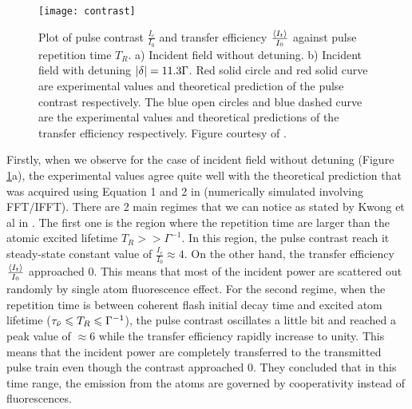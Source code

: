 \begin{figure}[h!]
    \centering
    \texttt{[image: contrast]}
    \caption{Plot of pulse contrast $\frac{I_{c}}{I_{0}}$ and transfer efficiency $\frac{\expval{I_{t}}}{I_{0}}$ against pulse repetition time $T_{R}$. a) Incident field without detuning. b) Incident field with detuning $\abs{\delta} = 11.3 \Gamma$. Red solid circle and red solid curve are experimental values and theoretical prediction of the pulse contrast respectively. The blue open circles and blue dashed curve are the experimental values and theoretical predictions of the transfer efficiency respectively. Figure courtesy of \cite{Kwong2015}.}
    \label{fig: contrast}
\end{figure}

\newpage

Firstly, when we observe for the case of incident field without detuning (Figure \ref{fig: contrast}a), the experimental values agree quite well with the theoretical prediction that was acquired using Equation 1 and 2 in \cite{Kwong2015} (numerically simulated involving FFT/IFFT). There are 2 main regimes that we can notice as stated by Kwong et al in \cite{Kwong2015}. The first one is the region where the repetition time are larger than the atomic excited lifetime $T_{R} >> \Gamma^{-1}$. In this region, the pulse contrast reach it steady-state constant value of $\frac{I_{c}}{I_{0}} \approx 4$. On the other hand, the transfer efficiency $\frac{\expval{I_{t}}}{I_{0}}$ approached 0. This means that most of the incident power are scattered out randomly by single atom fluorescence effect. For the second regime, when the repetition time is between coherent flash initial decay time and excited atom lifetime ($\tau_{\Bar{\nu}} \leqslant T_{R} \leqslant \Gamma^{-1}$), the pulse contrast oscillates a little bit and reached a peak value of $\approx 6$ while the transfer efficiency rapidly increase to unity. This means that the incident power are completely transferred to the transmitted pulse train even though the contrast approached 0. They concluded that in this time range, the emission from the atoms are governed by cooperativity instead of fluorescences.\\

